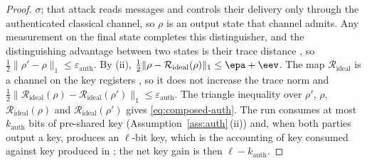 \begin{proof}
$\sigma$; that attack reads messages and controls their delivery only
through the authenticated classical channel, so $\rho$ is an output state
that channel admits. Any measurement on the final state completes this
distinguisher, and the distinguishing advantage between two states is their
trace distance \cite[Sec.~III.B.1]{portmann2022security}, so
$\frac12\|\rho'-\rho\|_1\le\varepsilon_{\mathrm{auth}}$. By (ii),
$\frac12\|\rho-\mathcal R_{\mathrm{ideal}}(\rho)\|_1\le\epa+\eev$. The map
$\mathcal R_{\mathrm{ideal}}$ is a channel on the key registers
\cite[Sec.~3.3, Eqs.~(13), (17)]{tupkary2026decoy}, so it does not increase the
trace norm and
$\frac12\|\mathcal R_{\mathrm{ideal}}(\rho)-\mathcal R_{\mathrm{ideal}}(\rho')\|_1
\le\varepsilon_{\mathrm{auth}}$. The triangle inequality over $\rho'$, $\rho$,
$\mathcal R_{\mathrm{ideal}}(\rho)$ and $\mathcal R_{\mathrm{ideal}}(\rho')$
gives \eqref{eq:composed-auth}. The run consumes at most $k_{\mathrm{auth}}$
bits of pre-shared key (Assumption~\ref{ass:auth}\,(ii)) and, when both
parties output a key, produces an $\ell$-bit key, which is the accounting of
key consumed against key produced in \cite[Sec.~VII.D]{portmann2022security};
the net key gain is then $\ell-k_{\mathrm{auth}}$.
\end{proof}
